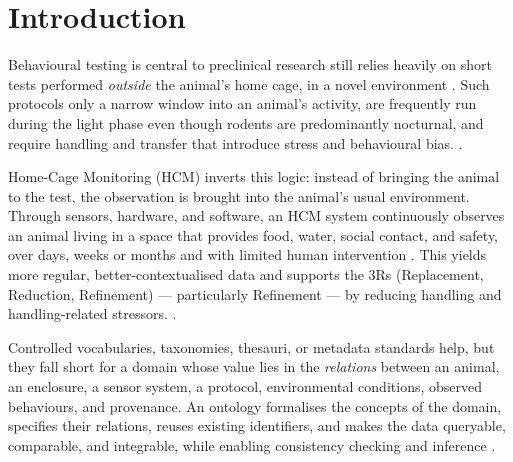 \section{Introduction}
Behavioural testing is central to preclinical research still relies heavily on short tests performed \emph{outside} the animal's home cage, in a novel environment \cite{kiryk2026}. Such protocols  only a narrow window into an animal's activity, are frequently run during the light phase even though rodents are predominantly nocturnal, and require handling and transfer that introduce stress and behavioural bias.  \cite{kiryk2026}.

Home-Cage Monitoring (HCM) inverts this logic: instead of bringing the animal to the test, the observation is brought into the animal's usual environment. Through sensors, hardware, and software, an HCM system continuously observes an animal living in a space that provides food, water, social contact, and safety, over days, weeks or months and with limited human intervention \cite{kiryk2026,huzard2026tech}. This yields more regular, better-contextualised data and supports the 3Rs (Replacement, Reduction, Refinement) --- particularly Refinement --- by reducing handling and handling-related stressors.  \cite{kiryk2026}.


Controlled vocabularies, taxonomies, thesauri, or metadata standards help, but they fall short for a domain whose value lies in the \emph{relations} between an animal, an enclosure, a sensor system, a protocol, environmental conditions, observed behaviours, and provenance. An ontology formalises the concepts of the domain, specifies their relations, reuses existing identifiers, and makes the data queryable, comparable, and integrable, while enabling consistency checking and inference \cite{noy2001}.


